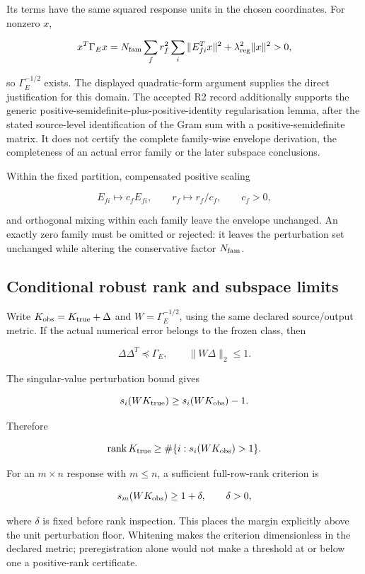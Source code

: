 \documentclass[
  11pt,
  a4paper]{article}
\begin{document}
Its terms have the same squared response units in the chosen coordinates. For nonzero \(x\),

\[
x^T\Gamma_Ex
=N_{\rm fam}\sum_f r_f^2\sum_i\|E_{fi}^Tx\|^2
+\lambda_{\rm reg}^2\|x\|^2>0,
\]

so \(\Gamma_E^{-1/2}\) exists. The displayed quadratic-form argument supplies the direct justification for this domain. The accepted R2 record additionally supports the generic positive-semidefinite-plus-positive-identity regularisation lemma, after the stated source-level identification of the Gram sum with a positive-semidefinite matrix. It does not certify the complete family-wise envelope derivation, the completeness of an actual error family or the later subspace conclusions.

Within the fixed partition, compensated positive scaling

\[
E_{fi}\mapsto c_fE_{fi},\qquad r_f\mapsto r_f/c_f,
\qquad c_f>0,
\]

and orthogonal mixing within each family leave the envelope unchanged. An exactly zero family must be omitted or rejected: it leaves the perturbation set unchanged while altering the conservative factor \(N_{\rm fam}\).

\hypertarget{conditional-robust-rank-and-subspace-limits}{%
\subsection{Conditional robust rank and subspace limits}\label{conditional-robust-rank-and-subspace-limits}}

Write \(K_{\rm obs}=K_{\rm true}+\Delta\) and
\(W=\Gamma_E^{-1/2}\), using the same declared source/output metric. If the
actual numerical error belongs to the frozen class, then

\[
\Delta\Delta^T\preceq\Gamma_E,
\qquad \|W\Delta\|_2\le1.
\]

The singular-value perturbation bound gives

\[
s_i(WK_{\rm true})\ge s_i(WK_{\rm obs})-1.
\]

Therefore

\[
\operatorname{rank}K_{\rm true}
\ge\#\{i:s_i(WK_{\rm obs})>1\}.
\]

For an \(m\times n\) response with \(m\le n\), a sufficient full-row-rank
criterion is

\[
s_m(WK_{\rm obs})\ge1+\delta,
\qquad \delta>0,
\]

where \(\delta\) is fixed before rank inspection. This places the margin
explicitly above the unit perturbation floor. Whitening makes the criterion
dimensionless in the declared metric; preregistration alone would not make a
threshold at or below one a positive-rank certificate.
\end{document}

